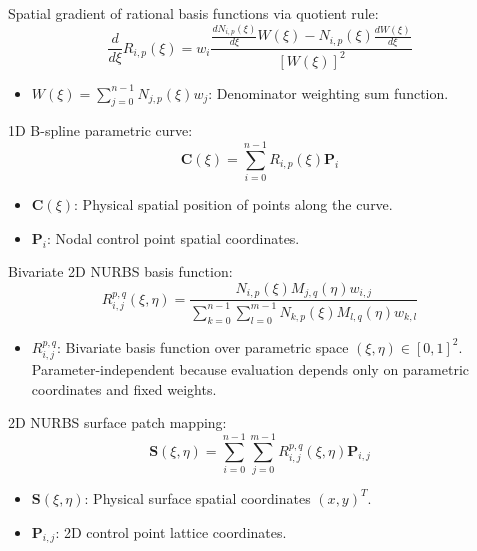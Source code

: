 \documentclass[12pt,a4paper,oneside]{report}
\newcommand{\vect}[1]{\mathbf{#1}}
\begin{document}
Spatial gradient of rational basis functions via quotient rule:
\begin{equation}
    \frac{d}{d\xi} R_{i,p}(\xi) = w_i \frac{\frac{d N_{i,p}(\xi)}{d\xi} W(\xi) - N_{i,p}(\xi) \frac{d W(\xi)}{d\xi}}{[W(\xi)]^2}
\end{equation}
\begin{tcolorbox}[colback=gray!5!white,colframe=gray!60!black,title={Term Definitions \& Parameter Dependencies}]
\begin{itemize}
    \item $W(\xi) = \sum_{j=0}^{n-1} N_{j,p}(\xi) w_j$: Denominator weighting sum function.
\end{itemize}
\end{tcolorbox}

1D B-spline parametric curve:
\begin{equation}
    \vect{C}(\xi) = \sum_{i=0}^{n-1} R_{i,p}(\xi) \vect{P}_i
\end{equation}
\begin{tcolorbox}[colback=gray!5!white,colframe=gray!60!black,title={Term Definitions \& Parameter Dependencies}]
\begin{itemize}
    \item $\vect{C}(\xi)$: Physical spatial position of points along the curve.
    \item $\vect{P}_i$: Nodal control point spatial coordinates.
\end{itemize}
\end{tcolorbox}

Bivariate 2D NURBS basis function:
\begin{equation}
    R_{i,j}^{p,q}(\xi, \eta) = \frac{N_{i,p}(\xi) M_{j,q}(\eta) w_{i,j}}{\sum_{k=0}^{n-1} \sum_{l=0}^{m-1} N_{k,p}(\xi) M_{l,q}(\eta) w_{k,l}}
\end{equation}
\begin{tcolorbox}[colback=gray!5!white,colframe=gray!60!black,title={Term Definitions \& Parameter Dependencies}]
\begin{itemize}
    \item $R_{i,j}^{p,q}$: Bivariate basis function over parametric space $(\xi, \eta) \in [0,1]^2$. Parameter-independent because evaluation depends only on parametric coordinates and fixed weights.
\end{itemize}
\end{tcolorbox}

2D NURBS surface patch mapping:
\begin{equation}
    \vect{S}(\xi, \eta) = \sum_{i=0}^{n-1} \sum_{j=0}^{m-1} R_{i,j}^{p,q}(\xi, \eta) \vect{P}_{i,j}
\end{equation}
\begin{tcolorbox}[colback=gray!5!white,colframe=gray!60!black,title={Term Definitions \& Parameter Dependencies}]
\begin{itemize}
    \item $\vect{S}(\xi, \eta)$: Physical surface spatial coordinates $(x, y)^T$.
    \item $\vect{P}_{i,j}$: 2D control point lattice coordinates.
\end{itemize}
\end{tcolorbox}
\end{document}
